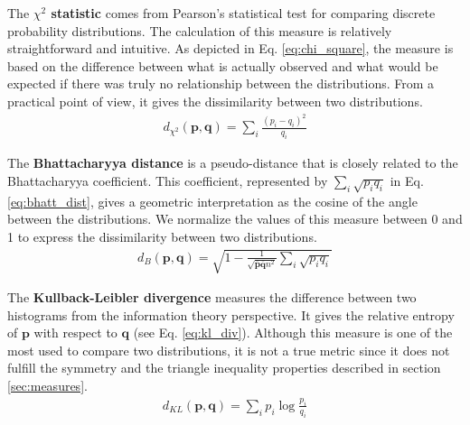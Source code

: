 The \textbf{$\chi^2$ statistic} comes from Pearson's statistical test for comparing discrete probability distributions. The calculation of this measure is relatively straightforward and intuitive. As depicted in Eq. \eqref{eq:chi_square}, the measure is based on the difference between what is actually observed and what would be expected if there was truly no relationship between the distributions. From a practical point of view, it gives the dissimilarity between two distributions.
\begin{eqnarray}
d_{\chi^2}(\mathbf{p},\mathbf{q}) = \sum\nolimits_i \frac{(p_i - q_i)^2}{q_i} \label{eq:chi_square}
\end{eqnarray}


The \textbf{Bhattacharyya distance} \citep{Bhattacharyya:IJS:1946} is a pseudo-distance that is closely related to the Bhattacharyya coefficient. This coefficient, represented by $\sum_i\sqrt{p_{i}q_{i}}$ in Eq. \eqref{eq:bhatt_dist}, gives a geometric interpretation as the cosine of the angle between the distributions. We normalize the values of this measure between 0 and 1 to express the dissimilarity between two distributions.
\begin{eqnarray}
d_{B}(\mathbf{p}, \mathbf{q}) = \sqrt{1- \frac{1}{\sqrt{\overline{\mathbf{p}} \overline{\mathbf{q}} n^2}} \sum\nolimits_{i} \sqrt{p_i q_i}} \label{eq:bhatt_dist}
\end{eqnarray}

The \textbf{Kullback-Leibler divergence} \citep{Kullback.Leibler:IMS:1951}  measures the difference between two histograms from the information theory perspective. It gives the relative entropy of $\mathbf{p}$ with respect to $\mathbf{q}$ (see Eq. \eqref{eq:kl_div}). Although this measure is one of the most used to compare two distributions, it is not a true metric since it does not fulfill the symmetry and the triangle inequality properties described in section \ref{sec:measures}.
\begin{eqnarray}
d_{KL}(\mathbf{p}, \mathbf{q}) = \sum\nolimits_{i}p_i \log\frac{p_i}{q_i} \label{eq:kl_div}
\end{eqnarray}

